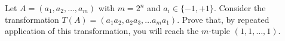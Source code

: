 Let $A = (a_1, a_2, \ldots, a_m)$ with $m = 2^n$ and $a_i \in \{-1, +1\}$. Consider the transformation $T(A) = (a_1a_2, a_2a_3, \ldots a_ma_1)$. Prove that, by repeated application of this transformation, you will reach the $m$-tuple $(1, 1, \ldots, 1)$.

